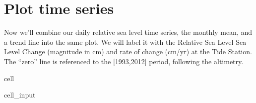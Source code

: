 \documentclass[letterpaper,10pt,english]{jupyterBook}
\begin{document}
\section{Plot time series}
\label{\detokenize{notebooks/regional_and_local/SL_Trend:rsltimeseries}}\label{\detokenize{notebooks/regional_and_local/SL_Trend:id2}}
\sphinxAtStartPar
Now we’ll combine our daily relative sea level time series, the monthly mean, and a trend line into the same plot. We will label it with the Relative Sea Level Sea Level Change (magnitude in cm) and rate of change (cm/yr) at the Tide Station. The “zero” line is referenced to the {[}1993,2012{]} period, following the altimetry.

\begin{sphinxuseclass}{cell}\begin{sphinxVerbatimInput}

\begin{sphinxuseclass}{cell_input}
\begin{sphinxVerbatim}[commandchars=\\\{\}]
  


  

   


\end{sphinxVerbatim}
\end{sphinxuseclass}
\end{sphinxVerbatimInput}
\end{sphinxuseclass}
\end{document}
